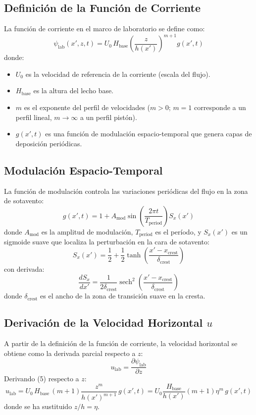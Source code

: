 \documentclass[11pt,a4paper]{article}
\begin{document}
\subsection{Definición de la Función de Corriente}
La función de corriente en el marco de laboratorio se define como:
\begin{equation}
    \psi_{\text{lab}}(x', z, t) = U_0 \, H_{\text{base}} \left( \frac{z}{h(x')} \right)^{m+1} g(x', t)
\end{equation}
donde:
\begin{itemize}
    \item $U_0$ es la velocidad de referencia de la corriente (escala del flujo).
    \item $H_{\text{base}}$ es la altura del lecho base.
    \item $m$ es el exponente del perfil de velocidades ($m > 0$; $m = 1$ corresponde a un perfil lineal, $m \to \infty$ a un perfil pistón).
    \item $g(x', t)$ es una función de modulación espacio-temporal que genera capas de deposición periódicas.
\end{itemize}

\subsection{Modulación Espacio-Temporal}
La función de modulación controla las variaciones periódicas del flujo en la zona de sotavento:
\begin{equation}
    g(x', t) = 1 + A_{\text{mod}} \sin\!\left(\frac{2\pi t}{T_{\text{period}}}\right) S_x(x')
\end{equation}
donde $A_{\text{mod}}$ es la amplitud de modulación, $T_{\text{period}}$ es el período, y $S_x(x')$ es un sigmoide suave que localiza la perturbación en la cara de sotavento:
\begin{equation}
    S_x(x') = \frac{1}{2} + \frac{1}{2} \tanh\!\left(\frac{x' - x_{\text{crest}}}{\delta_{\text{crest}}}\right)
\end{equation}
con derivada:
\begin{equation}
    \frac{dS_x}{dx'} = \frac{1}{2\delta_{\text{crest}}} \operatorname{sech}^2\!\left(\frac{x' - x_{\text{crest}}}{\delta_{\text{crest}}}\right)
\end{equation}
donde $\delta_{\text{crest}}$ es el ancho de la zona de transición suave en la cresta.

\subsection{Derivación de la Velocidad Horizontal $u$}
A partir de la definición de la función de corriente, la velocidad horizontal se obtiene como la derivada parcial respecto a $z$:
\begin{equation}
    u_{\text{lab}} = \frac{\partial \psi_{\text{lab}}}{\partial z}
\end{equation}
Derivando (5) respecto a $z$:
\begin{equation}
    u_{\text{lab}} = U_0 \, H_{\text{base}} \, (m+1) \frac{z^m}{h(x')^{m+1}} \, g(x', t) = U_0 \frac{H_{\text{base}}}{h(x')} (m+1) \eta^m \, g(x', t)
\end{equation}
donde se ha sustituido $z/h = \eta$.
\end{document}
